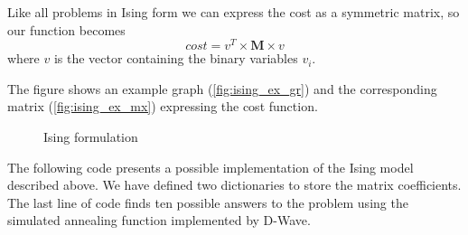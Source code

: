 Like all problems in Ising form we can express the cost as a symmetric matrix, so our function becomes
\[
cost = v^T \times \mathbf{M} \times v
\]
where $v$ is the vector containing the binary variables $v_i$.

The figure shows an example graph (\ref{fig:ising_ex_gr}) and the corresponding matrix (\ref{fig:ising_ex_mx}) expressing the cost function.

\begin{figure}[h]
	\centering
	 \qquad
	\caption{Ising formulation}
	\label{fig:ising_ex}
\end{figure}

The following code presents a possible implementation of the Ising model described above. We have defined two dictionaries to store the matrix coefficients. The last line of code finds ten possible answers to the problem using the simulated annealing function implemented by D-Wave.
\begin{listingenv}[H]
	\caption{Ising example}
	\label{lst:ising_ex}
\end{listingenv}

